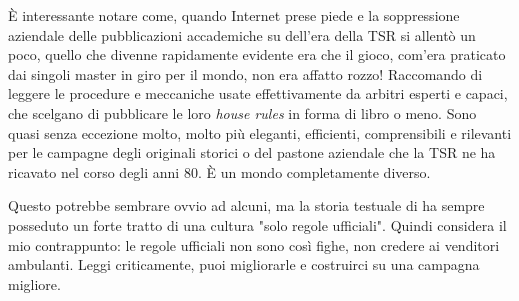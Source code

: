 È interessante notare come, quando Internet prese piede e la soppressione aziendale delle pubblicazioni accademiche su \dnd dell'era della TSR si allentò un poco, quello che divenne rapidamente evidente era che il gioco, com'era praticato dai singoli master in giro per il mondo, non era affatto rozzo! Raccomando di leggere le procedure e meccaniche usate effettivamente da arbitri esperti e capaci, che scelgano di pubblicare le loro \textit{house rules} in forma di libro o meno. Sono quasi senza eccezione molto, molto più eleganti, efficienti, comprensibili e rilevanti per le campagne degli originali storici o del pastone aziendale che la TSR ne ha ricavato nel corso degli anni 80. È un mondo completamente diverso.

Questo potrebbe sembrare ovvio ad alcuni, ma la storia testuale di \dnd{} ha sempre posseduto un forte tratto di una cultura "solo regole ufficiali". Quindi considera il mio contrappunto: le regole ufficiali non sono così fighe, non credere ai venditori ambulanti. Leggi criticamente, puoi migliorarle e costruirci su una campagna migliore.